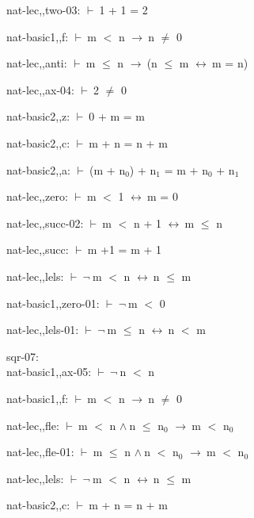\documentclass[a4paper]{article}
\newcommand{\Fol}{\mbox{$\vdash\ $}}
\newcommand{\Not}{\mbox{$\neg\ $}}
\newcommand{\And}{\mbox{$\wedge\ $}}
\newcommand{\Imp}{\mbox{$\rightarrow\ $}}
\newcommand{\Equiv}{\mbox{$\leftrightarrow\ $}}
\begin{document}
nat-lec,,two-03: 
 \Fol 1 + 1 = 2



nat-basic1,,f: 
 \Fol m $<$ n \Imp n $\neq$ 0



nat-lec,,anti: 
 \Fol m $\le$ n \Imp (n $\le$ m \Equiv m = n)



nat-lec,,ax-04: 
 \Fol 2 $\neq$ 0



nat-basic2,,z: 
 \Fol 0 + m = m



nat-basic2,,c: 
 \Fol m + n = n + m



nat-basic2,,a: 
 \Fol (m + $\mbox{n}_{0}$) + $\mbox{n}_{1}$ = m + $\mbox{n}_{0}$ + $\mbox{n}_{1}$



nat-lec,,zero: 
 \Fol m $<$ 1 \Equiv m = 0



nat-lec,,succ-02: 
 \Fol m $<$ n + 1 \Equiv m $\le$ n



nat-lec,,succ: 
 \Fol m +1 = m + 1



nat-lec,,lels: 
 \Fol \Not m $<$ n \Equiv n $\le$ m



nat-basic1,,zero-01: 
 \Fol \Not m $<$ 0



nat-lec,,lels-01: 
 \Fol \Not m $\le$ n \Equiv n $<$ m



\bigskip

sqr-07:\\ nat-basic1,,ax-05: 
 \Fol \Not n $<$ n



nat-basic1,,f: 
 \Fol m $<$ n \Imp n $\neq$ 0



nat-lec,,fle: 
 \Fol m $<$ n \And n $\le$ $\mbox{n}_{0}$ \Imp m $<$ $\mbox{n}_{0}$



nat-lec,,fle-01: 
 \Fol m $\le$ n \And n $<$ $\mbox{n}_{0}$ \Imp m $<$ $\mbox{n}_{0}$



nat-lec,,lels: 
 \Fol \Not m $<$ n \Equiv n $\le$ m



nat-basic2,,c: 
 \Fol m + n = n + m
\end{document}
